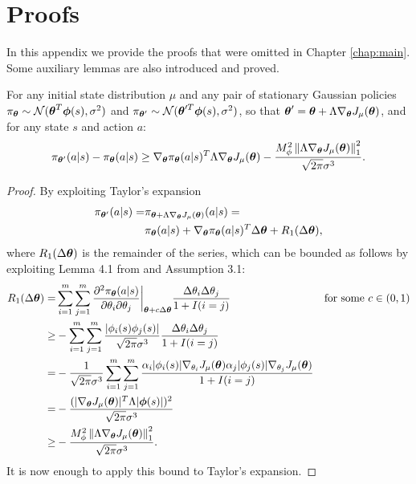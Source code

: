 \chapter{Proofs}\label{app:proofs}
In this appendix we provide the proofs that were omitted in Chapter \ref{chap:main}. Some auxiliary lemmas are also introduced and proved.

\begin{lemma}\label{aux:1}
For any initial state distribution $\mu$ and any pair of stationary Gaussian policies $\pi_{\vtheta} \sim \mathcal{N}(\vtheta^T\boldsymbol{\phi}(s),\sigma^2)$ and $\pi_{\vtheta'} \sim \mathcal{N}(\vtheta'^T\boldsymbol{\phi}(s),\sigma^2)$, so that $\vtheta'=\vtheta+\Lambda\gradJ{\vtheta}$, and for any state $s$ and action $a$:
\[
\pi_{\vtheta'}(a|s) - \pi_{\vtheta}(a|s) \geq \nabla_{\vtheta}\pi_{\vtheta}(a|s)^T\Lambda\gradJ{\vtheta} 
	- \frac{M_{\phi}^2\norm[1]{\Lambda\gradJ{\vtheta}}^2}{\sqrt{2\pi}\sigma^3}.
\]
\end{lemma}

\begin{proof}
By exploiting Taylor's expansion
\begin{align*}
\pi_{\vtheta'}(a|s) = & \pi_{\vtheta + \Lambda\gradJ{\vtheta}}(a|s) = \\
	& \pi_{\vtheta}(a|s) + \nabla_{\vtheta}\pi_{\vtheta}(a|s)^T\Delta\vtheta+R_1(\Delta\vtheta),
\end{align*}
where $R_1(\Delta\vtheta)$ is the remainder of the series, which can be bounded as follows by exploiting Lemma 4.1 from \cite{NIPS2013_5186} and Assumption 3.1:
\begin{align*}
R_1(\Delta\vtheta) = & \sum\limits_{i=1}^m\sum\limits_{j=1}^m
\frac{\partial^2\pi_{\vtheta}(a|s)}{\partial\theta_i\partial\theta_j} \bigg|_{\vtheta+c\Delta\vtheta} \frac{\Delta\theta_i\Delta\theta_j}{1+I(i=j)} & \text{for some $c \in (0,1)$} \\
	\geq & - \sum\limits_{i=1}^m\sum\limits_{j=1}^m \frac{|\phi_i(s)\phi_j(s)|}{\sqrt{2\pi}\sigma^3}
	\frac{\Delta\theta_i\Delta\theta_j}{1+I(i=j)} \\
	= & -\frac{1}{\sqrt{2\pi}\sigma^3}\sum\limits_{i=1}^m\sum\limits_{j=1}^m
	\frac{\alpha_i|\phi_i(s)|\gradJ{\theta_i}\alpha_j|\phi_j(s)|\gradJ{\theta_j}}{1+I(i=j)} \\
	= & - \frac{(|\gradJ{\vtheta}|^T\Lambda|\vphi(s)|)^2}{\sqrt{2\pi}\sigma^3} \\
	\geq & - \frac{M_{\phi}^2\norm[1]{\Lambda\gradJ{\vtheta}}^2}{\sqrt{2\pi}\sigma^3}.
\end{align*}
It is now enough to apply this bound to Taylor's expansion.
\end{proof}


